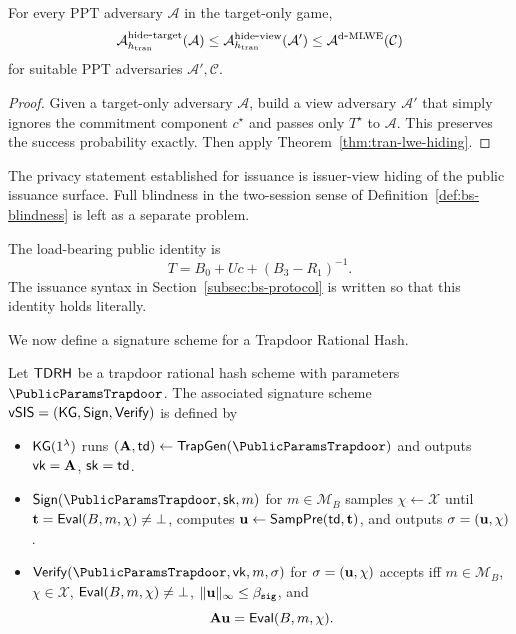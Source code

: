 \begin{corollary}\label{cor:tran-target-hiding}
For every PPT adversary \(\mathcal A\) in the target-only game,
\begin{equation}\label{eq:tran-target-hiding}
\mathcal{A}^{\mathrm{hide\mbox{-}target}}_{h_{\mathrm{tran}}}(\mathcal A)
\le
\mathcal{A}^{\mathrm{hide\mbox{-}view}}_{h_{\mathrm{tran}}}(\mathcal A')
\le
\mathcal{A}^{\mathrm{d\mbox{-}MLWE}}(\mathcal C)
\end{equation}
for suitable PPT adversaries \(\mathcal A',\mathcal C\).
\end{corollary}

\begin{proof}
Given a target-only adversary \(\mathcal A\), build a view adversary \(\mathcal A'\) that simply ignores the
commitment component \(c^\star\) and passes only \(T^\star\) to \(\mathcal A\). This preserves the success probability
exactly. Then apply Theorem~\ref{thm:tran-lwe-hiding}.
\end{proof}

\begin{remark}\label{rem:aligned-public-identity}
The privacy statement established for issuance is issuer-view hiding of the public issuance surface. Full
blindness in the two-session sense of Definition~\ref{def:bs-blindness} is left as a separate problem.

The load-bearing public identity is
\[
T = B_0 + Uc + (B_3-R_1)^{-1}.
\]
The issuance syntax in Section~\ref{subsec:bs-protocol} is written so that this identity holds literally.
\end{remark}

We now  define a signature scheme for a Trapdoor Rational Hash.

\begin{definition}\label{def:vsis-template}
Let \(\mathsf{TDRH}\) be a trapdoor rational hash scheme  with parameters
\(\PublicParamsTrapdoor\). The associated signature scheme
\(\mathsf{vSIS}=(\mathsf{KG},\mathsf{Sign},\mathsf{Verify})\) is defined by
\begin{itemize}[leftmargin=1.25em]
  \item \(\mathsf{KG}(1^\lambda)\) runs \((\mA,\trapdoor)\gets \TrapGen(\PublicParamsTrapdoor)\) and outputs
  \(\mathsf{vk}=\mathbf{A}\), \(\mathsf{sk}=\mathsf{td}\).
  \item \(\Sign(\PublicParamsTrapdoor,\sk,m)\) for \(m\in\mathcal{M}_B\) samples \(\chi\gets\mathcal{X}\) until
  \(\mathbf{t}=\mathsf{Eval}(B,m,\chi)\neq\bot\), computes \(\mathbf{u}\gets \mathsf{SampPre}(\mathsf{td},\mathbf{t})\), and outputs
  \(\sigma=(\mathbf{u},\chi)\).
  \item \(\SigVerify(\PublicParamsTrapdoor,\vk,m,\sigma)\) for \(\sigma=(\mathbf{u},\chi)\) accepts iff \(m\in\mathcal{M}_B\),
  \(\chi\in\mathcal{X}\), \(\mathsf{Eval}(B,m,\chi)\neq\bot\), \(\|\mathbf{u}\|_\infty\le \beta_{\mathtt{sig}}\), and
  \[
    \mathbf{A}\mathbf{u}=\mathsf{Eval}(B,m,\chi).
  \]
\end{itemize}
\end{definition}

